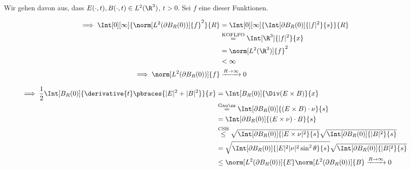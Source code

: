 \begin{solution}
\begin{enumerate}[label = (\roman*)]
    Wir gehen davon aus, dass $E(\cdot, t), B(\cdot, t) \in L^2(\R^3)$, $t > 0$.
    Sei $f$ eine dieser Funktionen.

    \begin{align*}
        \implies
        \Int[0][\infty]
        {
            \norm[L^2(\partial B_R(0))]{f}^2
        }{R}
        & =
        \Int[0][\infty]
        {
            \Int[\partial B_R(0)]{|f|^2}{s}
        }{R} \\
        & \stackrel
        {
            \mathrm{KOFLFO}
        }{=}
        \Int[\R^3]{|f|^2}{x} \\
        & =
        \norm[L^2(\R^3)]{f}^2 \\
        & <
        \infty \\
        \implies
        \norm[L^2(\partial B_R(0))]{f}
        & \xrightarrow{R \to \infty}
        0
    \end{align*}

    \begin{align*}
        \implies
        \frac{1}{2}
        \Int[B_R(0)]{\derivative{t} \pbraces{|E|^2 + |B|^2}}{x}
        & =
        \Int[B_R(0)]{\Div(E \times B)}{x} \\
        & \stackrel
        {
            \mathrm{Gauß}
        }{=}
        \Int[\partial B_R(0)]{(E \times B) \cdot \nu}{s} \\
        & =
        \Int[\partial B_R(0)]{(E \times \nu) \cdot B}{s} \\
        & \stackrel
        {
            \mathrm{CSB}
        }{\leq}
        \sqrt
        {
            \Int[\partial B_R(0)]{|E \times \nu|^2}{s}
        }
        \sqrt
        {
            \Int[\partial B_R(0)]{|B|^2}{s}
        } \\
        & =
        \sqrt
        {
            \Int[\partial B_R(0)]{|E|^2 |\nu|^2 \sin^2 \theta}{s}
        }
        \sqrt
        {
            \Int[\partial B_R(0)]{|B|^2}{s}
        } \\
        & \leq
        \norm[L^2(\partial B_R(0))]{E}
        \norm[L^2(\partial B_R(0))]{B}
        \xrightarrow{R \to \infty}
        0
    \end{align*}

\end{enumerate}
    
\end{solution}

